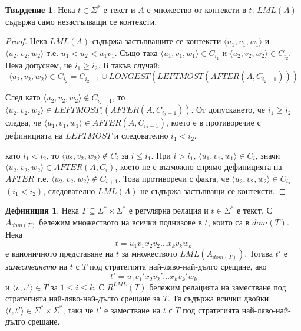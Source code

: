 \documentclass[12pt, oneside]{article}
\theoremstyle{definition}
\newtheorem{definition}{Дефиниция}[section]
\newtheorem{proposition}{Твърдение}[section]
\begin{document}
\begin{proposition}
	Нека \( t \in \Sigma^* \) е текст и \(A\) е множество от контексти в \(t\). \( LML(A) \) съдържа само незастъпващи се контексти.

	\begin{proof}
		Нека \( LML(A) \) съдържа застъпващите се контексти \( \langle u_1, v_1, w_1 \rangle \) и \( \langle u_2, v_2, w_2 \rangle \) т.е. \( u_1 < u_2 < u_1v_1 \). Също така \( \langle u_1, v_1, w_1 \rangle \in C_{i_1} \) и \( \langle u_2, v_2, w_2 \rangle \in C_{i_2} \). Нека допуснем, че \( i_1 \geq i_2 \). В такъв случай:
		\[ \langle u_2, v_2, w_2 \rangle \in C_{i_2} = C_{i_2-1} \cup LONGEST(LEFTMOST(AFTER(A, C_{i_2-1}))) \]

		\noindent След като \( \langle u_2, v_2, w_2 \rangle \notin C_{i_2-1} \), то \( \langle u_2, v_2, w_2 \rangle \in LEFTMOST((AFTER(A, C_{i_2-1})) \).
		От допускането, че \( i_1 \geq i_2 \) следва, че \( \langle u_1, v_1, w_1 \rangle \in AFTER(A,C_{i_2-1}) \), което е в противоречие с дефиницията на \( LEFTMOST \) и следователно \( i_1 < i_2 \).

		 като \( i_1 < i_2 \), то \( \langle u_2, v_2, w_2 \rangle \notin C_i \) за \( i \leq i_1 \). При \( i > i_1 \), \( \langle u_1, v_1, w_1 \rangle \in C_i \), значи \( \langle u_2, v_2, w_2 \rangle \in AFTER(A, C_i) \), което не е възможно спрямо дефиницията на \( AFTER \) т.е. \( \langle u_2, v_2, w_2 \rangle \notin C_{i+1} \). Това противоречи с факта, че \( \langle u_2, v_2, w_2 \rangle \in C_{i_2} \) \( (i_1 < i_2) \), следователно \( LML(A) \) не съдържа застъпващи се контексти.
	\end{proof}
\end{proposition}

\begin{definition}
	Нека \( T \subseteq \Sigma^* \times \Sigma^* \) е регулярна релация и \( t \in \Sigma^* \) е текст. С \( A_{dom(T)} \) бележим множеството на всички поднизове в \(t\), които са в \(dom(T)\). Нека \[ t = u_1 v_1 x_2 v_2 \dots x_k v_k w_k \] е каноничното представяне на \(t\) за множеството \( LML(A_{dom(T)}) \). Тогава \(t'\) е \emph{заместването} на \(t\) с \(T\) под стратегията най-ляво-най-дълго срещане, ако 
	\[t' = u_1 v_1' x_2 v_2' \dots x_k v_k' w_k\] 
	и \( \langle v, v' \rangle \in T \) за \( 1 \leq i \leq k \). С \( R^{LML}(T) \) бележим релацията на заместване под стратегията най-ляво-най-дълго срещане за \(T\). Тя съдържа всички двойки \( \langle t, t' \rangle \in \Sigma^* \times \Sigma^* \), така че \( t' \) е заместване на \( t \) с \(T\) под стратегията най-ляво-най-дълго срещане.
\end{definition}
\end{document}
